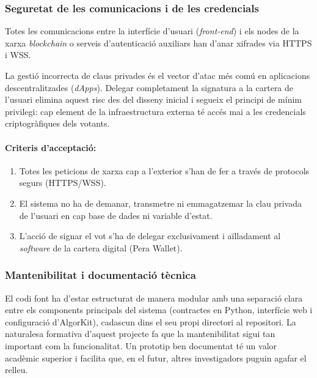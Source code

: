 \subsubsection{Seguretat de les comunicacions i de les credencials}

Totes les comunicacions entre la interfície d'usuari (\textit{front-end}) i els nodes de la xarxa \textit{blockchain} o serveis d'autenticació auxiliars han d'anar xifrades via HTTPS i WSS.

La gestió incorrecta de claus privades és el vector d'atac més comú en aplicacions descentralitzades (\textit{dApps}). 
Delegar completament la signatura a la cartera de l'usuari elimina aquest risc des del disseny inicial i segueix el principi de mínim privilegi: cap element de la infraestructura externa té accés mai a les credencials criptogràfiques dels votants.

\paragraph{Criteris d'acceptació:}
\begin{enumerate}[label=\roman*.]
    \item Totes les peticions de xarxa cap a l'exterior s'han de fer a través de protocols segurs (HTTPS/WSS).
    \item El sistema no ha de demanar, transmetre ni emmagatzemar la clau privada de l'usuari en cap base de dades ni variable d'estat.
    \item L'acció de signar el vot s'ha de delegar exclusivament i aïlladament al \textit{software} de la cartera digital (Pera Wallet).
\end{enumerate}

\subsubsection{Mantenibilitat i documentació tècnica}

El codi font ha d'estar estructurat de manera modular amb una separació clara entre els components principals del sistema (contractes en Python, interfície web i configuració d'AlgorKit), cadascun dins el seu propi directori al repositori.
La naturalesa formativa d'aquest projecte fa que la mantenibilitat sigui tan important com la funcionalitat. Un prototip ben documentat té un valor acadèmic superior i facilita que, en el futur, altres investigadors puguin agafar el relleu.

